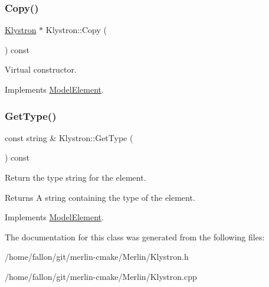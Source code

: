\subsubsection{\texorpdfstring{Copy()}{Copy()}}
{\footnotesize\ttfamily \hyperlink{classKlystron}{Klystron} $\ast$ Klystron\+::\+Copy (\begin{DoxyParamCaption}{ }\end{DoxyParamCaption}) const\hspace{0.3cm}{\ttfamily [virtual]}}

Virtual constructor. 

Implements \hyperlink{classModelElement_ac3ca26d649bd86a0f31a58ae09941429}{Model\+Element}.

\mbox{\label{classKlystron_a77d772abd8172d0de103bd14c838f6fc}} 
\subsubsection{\texorpdfstring{Get\+Type()}{GetType()}}
{\footnotesize\ttfamily const string \& Klystron\+::\+Get\+Type (\begin{DoxyParamCaption}{ }\end{DoxyParamCaption}) const\hspace{0.3cm}{\ttfamily [virtual]}}

Return the type string for the element. \begin{DoxyReturn}{Returns}
A string containing the type of the element. 
\end{DoxyReturn}


Implements \hyperlink{classModelElement_a04dc2e51e1999fca612eb1838ec6b271}{Model\+Element}.



The documentation for this class was generated from the following files\+:\begin{DoxyCompactItemize}
\item 
/home/fallon/git/merlin-\/cmake/\+Merlin/Klystron.\+h\item 
/home/fallon/git/merlin-\/cmake/\+Merlin/Klystron.\+cpp\end{DoxyCompactItemize}
